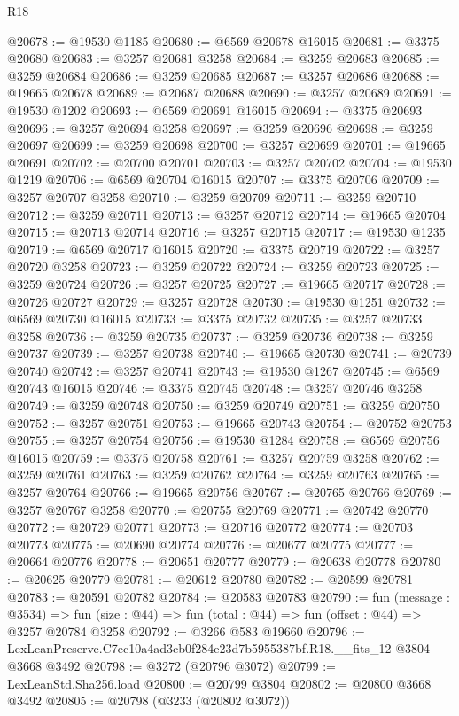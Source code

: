 \begin{lexlean}{R18}
\begin{coremodule}
@20678 := @19530 @1185
@20680 := @6569 @20678 @16015
@20681 := @3375 @20680
@20683 := @3257 @20681 @3258
@20684 := @3259 @20683
@20685 := @3259 @20684
@20686 := @3259 @20685
@20687 := @3257 @20686
@20688 := @19665 @20678
@20689 := @20687 @20688
@20690 := @3257 @20689
@20691 := @19530 @1202
@20693 := @6569 @20691 @16015
@20694 := @3375 @20693
@20696 := @3257 @20694 @3258
@20697 := @3259 @20696
@20698 := @3259 @20697
@20699 := @3259 @20698
@20700 := @3257 @20699
@20701 := @19665 @20691
@20702 := @20700 @20701
@20703 := @3257 @20702
@20704 := @19530 @1219
@20706 := @6569 @20704 @16015
@20707 := @3375 @20706
@20709 := @3257 @20707 @3258
@20710 := @3259 @20709
@20711 := @3259 @20710
@20712 := @3259 @20711
@20713 := @3257 @20712
@20714 := @19665 @20704
@20715 := @20713 @20714
@20716 := @3257 @20715
@20717 := @19530 @1235
@20719 := @6569 @20717 @16015
@20720 := @3375 @20719
@20722 := @3257 @20720 @3258
@20723 := @3259 @20722
@20724 := @3259 @20723
@20725 := @3259 @20724
@20726 := @3257 @20725
@20727 := @19665 @20717
@20728 := @20726 @20727
@20729 := @3257 @20728
@20730 := @19530 @1251
@20732 := @6569 @20730 @16015
@20733 := @3375 @20732
@20735 := @3257 @20733 @3258
@20736 := @3259 @20735
@20737 := @3259 @20736
@20738 := @3259 @20737
@20739 := @3257 @20738
@20740 := @19665 @20730
@20741 := @20739 @20740
@20742 := @3257 @20741
@20743 := @19530 @1267
@20745 := @6569 @20743 @16015
@20746 := @3375 @20745
@20748 := @3257 @20746 @3258
@20749 := @3259 @20748
@20750 := @3259 @20749
@20751 := @3259 @20750
@20752 := @3257 @20751
@20753 := @19665 @20743
@20754 := @20752 @20753
@20755 := @3257 @20754
@20756 := @19530 @1284
@20758 := @6569 @20756 @16015
@20759 := @3375 @20758
@20761 := @3257 @20759 @3258
@20762 := @3259 @20761
@20763 := @3259 @20762
@20764 := @3259 @20763
@20765 := @3257 @20764
@20766 := @19665 @20756
@20767 := @20765 @20766
@20769 := @3257 @20767 @3258
@20770 := @20755 @20769
@20771 := @20742 @20770
@20772 := @20729 @20771
@20773 := @20716 @20772
@20774 := @20703 @20773
@20775 := @20690 @20774
@20776 := @20677 @20775
@20777 := @20664 @20776
@20778 := @20651 @20777
@20779 := @20638 @20778
@20780 := @20625 @20779
@20781 := @20612 @20780
@20782 := @20599 @20781
@20783 := @20591 @20782
@20784 := @20583 @20783
@20790 := fun (message : @3534) =>
  fun (size : @44) => fun (total : @44) => fun (offset : @44) => @3257 @20784 @3258
@20792 := @3266 @583 @19660
@20796 := LexLeanPreserve.C7ec10a4ad3cb0f284e23d7b5955387bf.R18.__fits_12 @3804 @3668 @3492
@20798 := @3272 (@20796 @3072)
@20799 := LexLeanStd.Sha256.load
@20800 := @20799 @3804
@20802 := @20800 @3668 @3492
@20805 := @20798 (@3233 (@20802 @3072))

\end{coremodule}
\end{lexlean}
